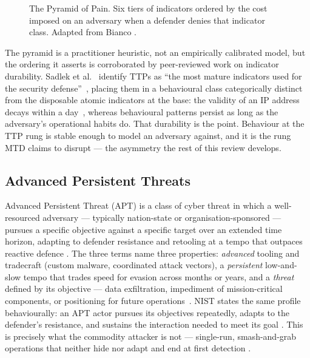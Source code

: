 \begin{figure}[!t]
{%
  }
  \caption{The Pyramid of Pain. Six tiers of indicators ordered by
  the cost imposed on an adversary when a defender denies that
  indicator class. Adapted from Bianco \cite{bianco2013}.}
  \label{fig:pop}
\end{figure}

The pyramid is a practitioner heuristic, not an empirically calibrated model, but the ordering it asserts is corroborated by peer-reviewed work on indicator durability. Sadlek et al.\ \cite{sadlek2022} identify TTPs as ``the most mature indicators used for the security defense''~\cite[p.~3]{sadlek2022}, placing them in a behavioural class categorically distinct from the disposable atomic indicators at the base: the validity of an IP address decays within a day~\cite{sadlek2022}, whereas behavioural patterns persist as long as the adversary's operational habits do. That durability is the point. Behaviour at the TTP rung is stable enough to model an adversary against, and it is the rung MTD claims to disrupt --- the asymmetry the rest of this review develops.



\subsection{Advanced Persistent Threats}
\label{subsec:apt}

Advanced Persistent Threat (APT) is a class of cyber threat in
which a well-resourced adversary --- typically nation-state or
organisation-sponsored --- pursues a specific objective against a
specific target over an extended time horizon, adapting to defender
resistance and retooling at a tempo that outpaces reactive defence
\cite{alshamrani2019}. The three terms name three properties:
\emph{advanced} tooling and tradecraft (custom malware, coordinated
attack vectors), a \emph{persistent} low-and-slow tempo that trades
speed for evasion across months or years, and a \emph{threat}
defined by its objective --- data exfiltration, impediment of
mission-critical components, or positioning for future
operations~\cite{alshamrani2019}. NIST states the same profile
behaviourally: an APT actor pursues its objectives repeatedly,
adapts to the defender's resistance, and sustains the interaction
needed to meet its goal \cite{alshamrani2019}. This is precisely
what the commodity attacker is not --- single-run, smash-and-grab
operations that neither hide nor adapt and end at first detection
\cite{alshamrani2019}.

